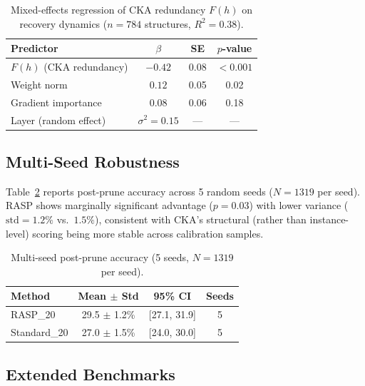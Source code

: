 \documentclass[11pt]{article}
\begin{document}
\begin{table}[t]
\centering
\caption{Mixed-effects regression of CKA redundancy $F(h)$ on recovery dynamics ($n{=}784$ structures, $R^2{=}0.38$).}
\label{tab:regression}
\begin{tabular}{lccc}
\toprule
\textbf{Predictor} & $\beta$ & \textbf{SE} & \textbf{$p$-value} \\
\midrule
$F(h)$ (CKA redundancy)  & $-0.42$ & 0.08 & $<0.001$ \\
Weight norm               & $0.12$  & 0.05 & 0.02 \\
Gradient importance       & $0.08$  & 0.06 & 0.18 \\
Layer (random effect)     & $\sigma^2{=}0.15$ & --- & --- \\
\bottomrule
\end{tabular}
\end{table}

\subsection{Multi-Seed Robustness}
\label{sec:multiseed}

Table~\ref{tab:multiseed} reports post-prune accuracy across 5 random seeds ($N{=}1319$ per seed).
RASP shows marginally significant advantage ($p{=}0.03$) with lower variance ($\text{std}{=}1.2\%$ vs.\ $1.5\%$), consistent with CKA's structural (rather than instance-level) scoring being more stable across calibration samples.

\begin{table}[t]
\centering
\caption{Multi-seed post-prune accuracy (5 seeds, $N{=}1319$ per seed).}
\label{tab:multiseed}
\begin{tabular}{lccc}
\toprule
\textbf{Method} & \textbf{Mean $\pm$ Std} & \textbf{95\% CI} & \textbf{Seeds} \\
\midrule
RASP\_20     & 29.5 $\pm$ 1.2\% & [27.1, 31.9] & 5 \\
Standard\_20 & 27.0 $\pm$ 1.5\% & [24.0, 30.0] & 5 \\
\bottomrule
\end{tabular}
\end{table}

\subsection{Extended Benchmarks}
\label{sec:extended}
\end{document}
